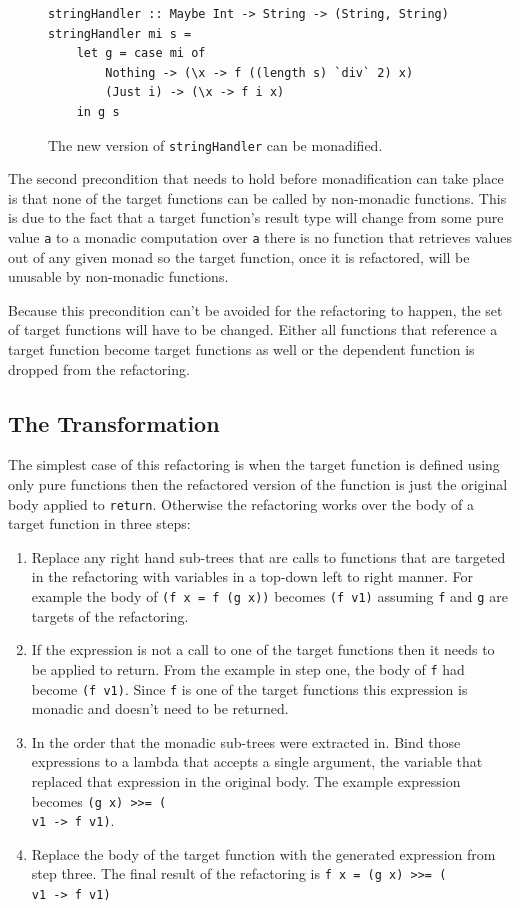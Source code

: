 \begin{figure}[t]
\begin{lstlisting}
stringHandler :: Maybe Int -> String -> (String, String)
stringHandler mi s = 
	let g = case mi of
		Nothing -> (\x -> f ((length s) `div` 2) x)
		(Just i) -> (\x -> f i x)
	in g s
\end{lstlisting}
\caption{The new version of \texttt{stringHandler} can be monadified.}
\label{etaHan}
\end{figure}

The second precondition that needs to hold before monadification can take place is that none of the target functions can be called by non-monadic functions. This is due to the fact that a target function's result type will change from some pure value \texttt{a} to a monadic computation over \texttt{a} there is no function that retrieves values out of any given monad so the target function, once it is refactored, will be unusable by non-monadic functions. 

Because this precondition can't be avoided for the refactoring to happen, the set of target functions will have to be changed. Either all functions that reference a target function become target functions as well or the dependent function is dropped from the refactoring.

\subsection{The Transformation}

The simplest case of this refactoring is when the target function is defined using only pure functions then the refactored version of the function is just the original body applied to \texttt{return}. Otherwise the refactoring works over the body of a target function in three steps:

\begin{enumerate}
\item Replace any right hand sub-trees that are calls to functions that are targeted in the refactoring with variables in a top-down left to right manner. For example the body of \texttt{(f x = f (g x))} becomes \texttt{(f v1)} assuming \texttt{f} and \texttt{g} are targets of the refactoring.
\item If the expression is not a call to one of the target functions then it needs to be applied to return. From the example in step one, the body of \texttt{f} had become \texttt{(f v1)}. Since \texttt{f} is one of the target functions this expression is monadic and doesn't need to be returned.
\item In the order that the monadic sub-trees were extracted in. Bind those expressions to a lambda that accepts a single argument, the variable that replaced that expression in the original body. The example expression becomes \texttt{(g x) >>= (\\v1 -> f v1)}.
\item Replace the body of the target function with the generated expression from step three. The final result of the refactoring is \texttt{f x = (g x) >>= (\\v1 -> f v1)}
\end{enumerate}

